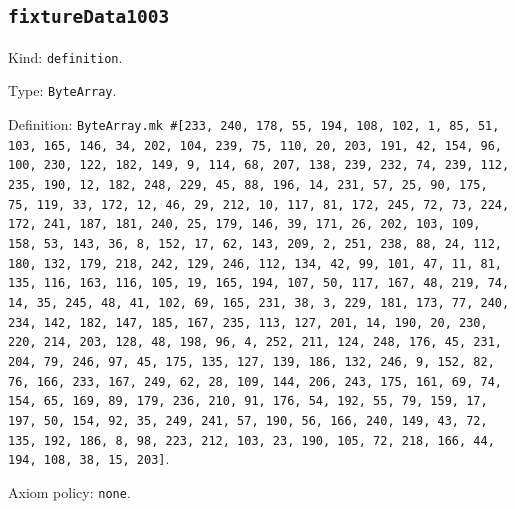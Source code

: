 \documentclass[11pt]{article}
\begin{document}
\subsection*{\texttt{fixtureData1003}}
\noindent Kind: \texttt{definition}.\par
\noindent Type: \texttt{ByteArray}.\par
\noindent Definition: \texttt{ByteArray.mk \#[233, 240, 178, 55, 194, 108, 102, 1, 85, 51, 103, 165, 146, 34, 202, 104, 239, 75, 110, 20, 203, 191, 42, 154, 96, 100, 230, 122, 182, 149, 9, 114, 68, 207, 138, 239, 232, 74, 239, 112, 235, 190, 12, 182, 248, 229, 45, 88, 196, 14, 231, 57, 25, 90, 175, 75, 119, 33, 172, 12, 46, 29, 212, 10, 117, 81, 172, 245, 72, 73, 224, 172, 241, 187, 181, 240, 25, 179, 146, 39, 171, 26, 202, 103, 109, 158, 53, 143, 36, 8, 152, 17, 62, 143, 209, 2, 251, 238, 88, 24, 112, 180, 132, 179, 218, 242, 129, 246, 112, 134, 42, 99, 101, 47, 11, 81, 135, 116, 163, 116, 105, 19, 165, 194, 107, 50, 117, 167, 48, 219, 74, 14, 35, 245, 48, 41, 102, 69, 165, 231, 38, 3, 229, 181, 173, 77, 240, 234, 142, 182, 147, 185, 167, 235, 113, 127, 201, 14, 190, 20, 230, 220, 214, 203, 128, 48, 198, 96, 4, 252, 211, 124, 248, 176, 45, 231, 204, 79, 246, 97, 45, 175, 135, 127, 139, 186, 132, 246, 9, 152, 82, 76, 166, 233, 167, 249, 62, 28, 109, 144, 206, 243, 175, 161, 69, 74, 154, 65, 169, 89, 179, 236, 210, 91, 176, 54, 192, 55, 79, 159, 17, 197, 50, 154, 92, 35, 249, 241, 57, 190, 56, 166, 240, 149, 43, 72, 135, 192, 186, 8, 98, 223, 212, 103, 23, 190, 105, 72, 218, 166, 44, 194, 108, 38, 15, 203]}.\par
\noindent Axiom policy: \texttt{none}.\par
\end{document}

